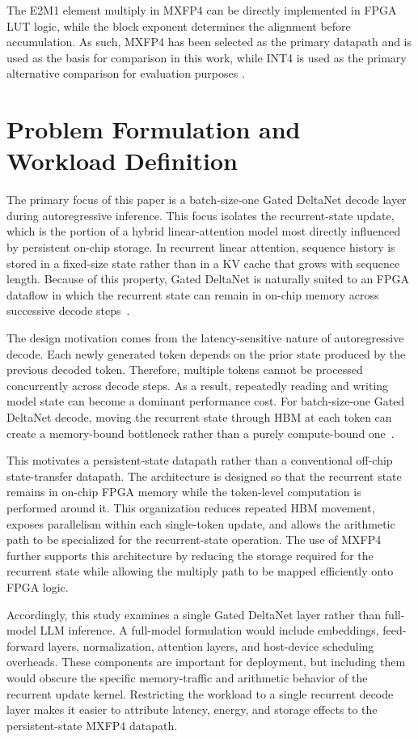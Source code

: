 ﻿\documentclass[conference]{IEEEtran}
\begin{document}
The E2M1 element multiply in MXFP4 can be directly implemented in FPGA LUT logic, while the block exponent determines the alignment before accumulation. As such, MXFP4 has been selected as the primary datapath and is used as the basis for comparison in this work, while INT4 is used as the primary alternative comparison for evaluation purposes \cite{b15}.

\section{Problem Formulation and Workload Definition}

The primary focus of this paper is a batch-size-one Gated DeltaNet decode layer during autoregressive inference. This focus isolates the recurrent-state update, which is the portion of a hybrid linear-attention model most directly influenced by persistent on-chip storage. In recurrent linear attention, sequence history is stored in a fixed-size state rather than in a KV cache that grows with sequence length. Because of this property, Gated DeltaNet is naturally suited to an FPGA dataflow in which the recurrent state can remain in on-chip memory across successive decode steps~\cite{b3,b10}.

The design motivation comes from the latency-sensitive nature of autoregressive decode. Each newly generated token depends on the prior state produced by the previous decoded token. Therefore, multiple tokens cannot be processed concurrently across decode steps. As a result, repeatedly reading and writing model state can become a dominant performance cost. For batch-size-one Gated DeltaNet decode, moving the recurrent state through HBM at each token can create a memory-bound bottleneck rather than a purely compute-bound one~\cite{b10}.

This motivates a persistent-state datapath rather than a conventional off-chip state-transfer datapath. The architecture is designed so that the recurrent state remains in on-chip FPGA memory while the token-level computation is performed around it. This organization reduces repeated HBM movement, exposes parallelism within each single-token update, and allows the arithmetic path to be specialized for the recurrent-state operation. The use of MXFP4 further supports this architecture by reducing the storage required for the recurrent state while allowing the multiply path to be mapped efficiently onto FPGA logic.

Accordingly, this study examines a single Gated DeltaNet layer rather than full-model LLM inference. A full-model formulation would include embeddings, feed-forward layers, normalization, attention layers, and host-device scheduling overheads. These components are important for deployment, but including them would obscure the specific memory-traffic and arithmetic behavior of the recurrent update kernel. Restricting the workload to a single recurrent decode layer makes it easier to attribute latency, energy, and storage effects to the persistent-state MXFP4 datapath.
\end{document}
